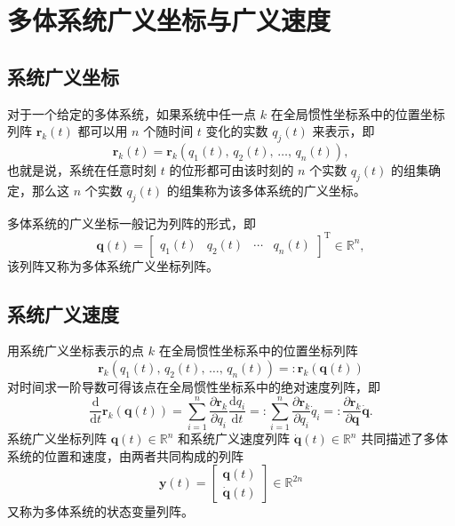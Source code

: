 \section{多体系统广义坐标与广义速度}

\subsection{系统广义坐标}

对于一个给定的多体系统，如果系统中任一点 $k$ 在全局惯性坐标系中的位置坐标列阵 $\boldsymbol{r}_k(t)$ 都可以用 $n$ 个随时间 $t$ 变化的实数 $q_j(t)$ 来表示，即
\begin{equation*}
\boldsymbol{r}_k(t) = \boldsymbol{r}_k\!\left(q_1(t),\, q_2(t),\, \ldots,\, q_n(t)\right),
\end{equation*}
也就是说，系统在任意时刻 $t$ 的位形都可由该时刻的 $n$ 个实数 $q_j(t)$ 的组集确定，那么这 $n$ 个实数 $q_j(t)$ 的组集称为该多体系统的广义坐标。

多体系统的广义坐标一般记为列阵的形式，即
\begin{equation}\label{eq:2.1}
\boldsymbol{q}(t) = \begin{bmatrix} q_1(t) & q_2(t) & \cdots & q_n(t) \end{bmatrix}^{\mathrm{T}} \in \mathbb{R}^n,
\end{equation}
该列阵又称为多体系统广义坐标列阵。

\subsection{系统广义速度}

用系统广义坐标表示的点 $k$ 在全局惯性坐标系中的位置坐标列阵
\begin{equation*}
\boldsymbol{r}_k\!\left(q_1(t),\, q_2(t),\, \ldots,\, q_n(t)\right) =: \boldsymbol{r}_k(\boldsymbol{q}(t))
\end{equation*}
对时间求一阶导数可得该点在全局惯性坐标系中的绝对速度列阵，即
\begin{equation}\label{eq:2.2}
\frac{\mathrm{d}}{\mathrm{d}t} \boldsymbol{r}_k(\boldsymbol{q}(t)) = \sum_{i=1}^{n} \frac{\partial \boldsymbol{r}_k}{\partial q_i} \frac{\mathrm{d} q_i}{\mathrm{d}t} =: \sum_{i=1}^{n} \frac{\partial \boldsymbol{r}_k}{\partial q_i} \dot{q}_i =: \frac{\partial \boldsymbol{r}_k}{\partial \boldsymbol{q}} \dot{\boldsymbol{q}}.
\end{equation}
系统广义坐标列阵 $\boldsymbol{q}(t) \in \mathbb{R}^n$ 和系统广义速度列阵 $\dot{\boldsymbol{q}}(t) \in \mathbb{R}^n$ 共同描述了多体系统的位置和速度，由两者共同构成的列阵
\begin{equation}\label{eq:2.3}
\boldsymbol{y}(t) = \begin{bmatrix} \boldsymbol{q}(t) \\ \dot{\boldsymbol{q}}(t) \end{bmatrix} \in \mathbb{R}^{2n}
\end{equation}
又称为多体系统的状态变量列阵。

